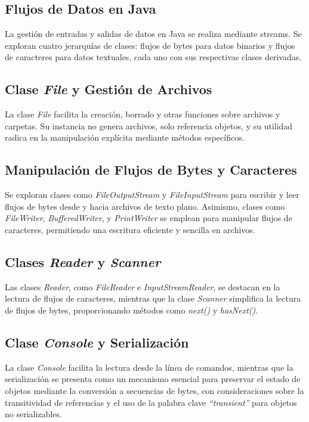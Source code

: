 \documentclass[11pt, twocolumn]{article}
\begin{document}
  \subsection*{Flujos de Datos en Java}
  La gestión de entradas y salidas de datos en Java se realiza mediante streams. Se exploran cuatro jerarquías de clases: flujos de bytes para datos binarios y flujos de caracteres para datos textuales, cada uno con sus respectivas clases derivadas.

  \subsection*{Clase \textit{File} y Gestión de Archivos}
  La clase \textit{File} facilita la creación, borrado y otras funciones sobre archivos y carpetas. Su instancia no genera archivos, solo referencia objetos, y su utilidad radica en la manipulación explícita mediante métodos específicos.

  \subsection*{Manipulación de Flujos de Bytes y Caracteres}
  Se exploran clases como \textit{FileOutputStream} y \textit{FileInputStream} para escribir y leer flujos de bytes desde y hacia archivos de texto plano. Asimismo, clases como \textit{FileWriter}, \textit{BufferedWriter}, y \textit{PrintWriter} se emplean para manipular flujos de caracteres, permitiendo una escritura eficiente y sencilla en archivos.

  \subsection*{Clases \textit{Reader} y \textit{Scanner}}
  Las clases \textit{Reader}, como \textit{FileReader} e \textit{InputStreamReader}, se destacan en la lectura de flujos de caracteres, mientras que la clase \textit{Scanner} simplifica la lectura de flujos de bytes, proporcionando métodos como \textit{next()} y \textit{hasNext()}.
  
  \subsection*{Clase \textit{Console} y Serialización}
  La clase \textit{Console} facilita la lectura desde la línea de comandos, mientras que la serialización se presenta como un mecanismo esencial para preservar el estado de objetos mediante la conversión a secuencias de bytes, con consideraciones sobre la transitividad de referencias y el uso de la palabra clave \textit{``transient''} para objetos no serializables.
\end{document}
